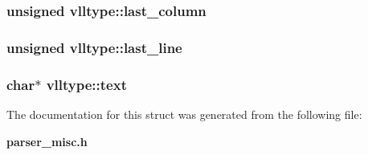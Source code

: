 \subsubsection{\setlength{\rightskip}{0pt plus 5cm}unsigned {\bf vlltype::last\_\-column}}\label{structvlltype_o3}


\subsubsection{\setlength{\rightskip}{0pt plus 5cm}unsigned {\bf vlltype::last\_\-line}}\label{structvlltype_o2}


\subsubsection{\setlength{\rightskip}{0pt plus 5cm}char$\ast$ {\bf vlltype::text}}\label{structvlltype_o4}




The documentation for this struct was generated from the following file:\begin{CompactItemize}
\item 
{\bf parser\_\-misc.h}\end{CompactItemize}
